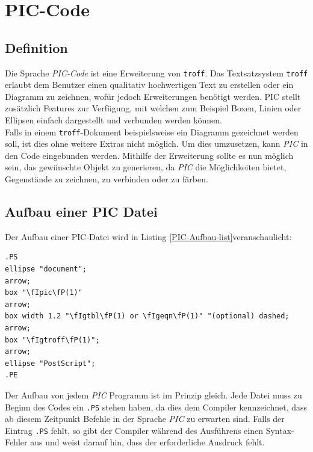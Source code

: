 
\label{cha:PIC - Code}
\section{PIC-Code}
\pra

\subsection{Definition}

 Die Sprache \textit{PIC-Code} ist eine Erweiterung von \verb|troff|. Das Textsatzsystem \verb|troff| erlaubt dem Benutzer einen qualitativ hochwertigen Text zu erstellen oder ein Diagramm zu zeichnen, wofür jedoch Erweiterungen benötigt werden. PIC stellt zusätzlich Features zur Verfügung, mit welchen zum Beispiel Boxen, Linien oder Ellipsen einfach dargestellt und verbunden werden können.
\\

\noindent
Falls in einem \verb|troff|-Dokument beispielsweise ein Diagramm gezeichnet werden soll, ist dies ohne weitere Extras nicht möglich. Um dies umzusetzen, kann \textit{PIC} in den Code eingebunden werden. Mithilfe der Erweiterung sollte es nun möglich sein, das gewünschte Objekt zu generieren, da \textit{PIC} die Möglichkeiten bietet, Gegenstände zu zeichnen, zu verbinden oder zu färben. \footnotemark[13]

\subsection{Aufbau einer PIC Datei}
\pra
\noindent
Der Aufbau einer PIC-Datei wird in Listing \ref{PIC-Aufbau-list}\footnotemark[13] veranschaulicht:
\noindent
\lstset{frame=lines}
\lstset{basicstyle=\footnotesize}
\begin{lstlisting}
.PS
ellipse "document";
arrow;
box "\fIpic\fP(1)"
arrow;
box width 1.2 "\fIgtbl\fP(1) or \fIgeqn\fP(1)" "(optional) dashed;
arrow;
box "\fIgtroff\fP(1)";
arrow;
ellipse "PostScript";
.PE

\end{lstlisting}
 Der Aufbau von jedem \textit{PIC} Programm ist im Prinzip gleich. Jede Datei muss zu Beginn des Codes ein \verb|.PS| stehen haben, da dies dem Compiler kennzeichnet, dass ab diesem Zeitpunkt Befehle in der Sprache \textit{PIC} zu erwarten sind. Falls der Eintrag \verb|.PS| fehlt, so gibt der Compiler während des Ausführens einen Syntax-Fehler aus und weist darauf hin, dass der erforderliche Ausdruck fehlt.
\\

